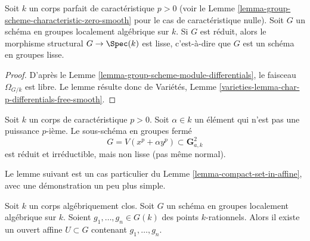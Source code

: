 \begin{lemma}
\label{lemma-reduced-group-scheme-prefect-field-characteristic-p-smooth}
Soit $k$ un corps parfait de caractéristique $p > 0$ (voir le
Lemme \ref{lemma-group-scheme-characteristic-zero-smooth}
pour le cas de caractéristique nulle).
Soit $G$ un schéma en groupes localement algébrique sur $k$.
Si $G$ est réduit, alors le morphisme
structural $G \to \Spec(k)$ est lisse, c'est-à-dire que $G$ est un
schéma en groupes lisse.
\end{lemma}

\begin{proof}
D'après le
Lemme \ref{lemma-group-scheme-module-differentials},
le faisceau $\Omega_{G/k}$ est libre. Le lemme résulte donc de
Variétés, Lemme \ref{varieties-lemma-char-p-differentials-free-smooth}.
\end{proof}

\begin{remark}
\label{remark-reduced-smooth-not-true-general}
Soit $k$ un corps de caractéristique $p > 0$.
Soit $\alpha \in k$ un élément qui n'est pas une puissance $p$-ième.
Le sous-schéma en groupes fermé
$$
G = V(x^p + \alpha y^p) \subset \mathbf{G}_{a, k}^2
$$
est réduit et irréductible, mais non lisse (pas même normal).
\end{remark}

\noindent
Le lemme suivant est un cas particulier du
Lemme \ref{lemma-compact-set-in-affine},
avec une démonstration un peu plus simple.

\begin{lemma}
\label{lemma-points-in-affine}
Soit $k$ un corps algébriquement clos.
Soit $G$ un schéma en groupes localement algébrique sur $k$.
Soient $g_1, \ldots, g_n \in G(k)$ des points $k$-rationnels.
Alors il existe un ouvert affine $U \subset G$ contenant $g_1, \ldots, g_n$.
\end{lemma}

